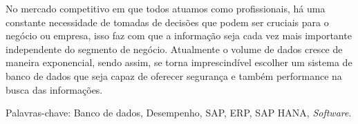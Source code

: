 \begin{resumo}
\vspace{-1cm}

\onehalfspacing

\noindent 
No mercado competitivo em que todos atuamos como profissionais, há uma constante necessidade de tomadas de decisões que podem ser cruciais para o negócio ou empresa, isso faz com que a informação seja cada vez mais importante independente do segmento de negócio. Atualmente o volume de dados cresce de maneira exponencial, sendo assim, se torna imprescindível escolher um sistema de banco de dados que seja capaz de oferecer segurança e também performance na busca das informações.

\vspace*{.75cm}

\noindent Palavras-chave: Banco de dados, Desempenho, SAP, ERP, SAP HANA, \textit{Software}.\\

\end{resumo}